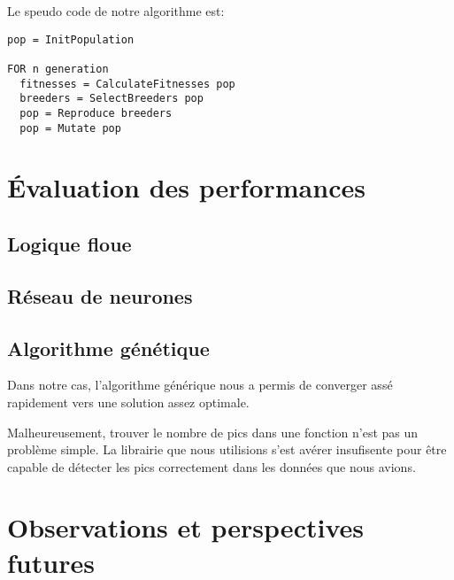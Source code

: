 \documentclass[12pt,letterpaper]{article}
\begin{document}
Le speudo code de notre algorithme est:

\begin{verbatim}
pop = InitPopulation

FOR n generation
  fitnesses = CalculateFitnesses pop
  breeders = SelectBreeders pop
  pop = Reproduce breeders
  pop = Mutate pop

\end{verbatim}


\section{Évaluation des performances}

\subsection{Logique floue}

\subsection{Réseau de neurones} %

\subsection{Algorithme génétique}

Dans notre cas, l'algorithme générique nous a permis de converger assé rapidement vers une solution assez optimale. 

Malheureusement, trouver le nombre de pics dans une fonction n'est pas un problème simple. La librairie que nous utilisions 
s'est avérer insufisente pour être capable de détecter les pics correctement dans les données que nous avions. 


\section{Observations et perspectives futures}
\end{document}
